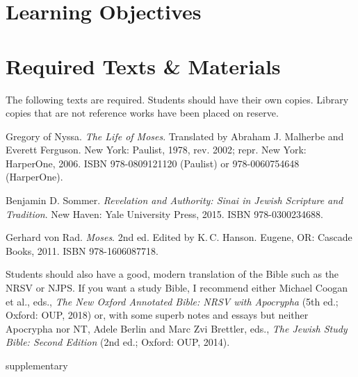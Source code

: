 \documentclass[titlepage]{article}
\newcommand\incl{../includes}
\begin{document}


\section{Learning Objectives}
\label{objectives}

\edobject

\section{Required Texts \& Materials}
\label{texts}

The following texts are required. Students should have their own copies.
Library copies that are not reference works have been placed on reserve.

\begingroup
\renewcommand{\section}[2]{}%
\begin{thebibliography}{Sommer}%

	 Gregory of Nyssa.
	\emph{The Life of Moses}. Translated by Abraham J. Malherbe and Everett Ferguson.
	New York: Paulist, 1978, rev. 2002; repr. New York: HarperOne, 2006.
	ISBN 978-0809121120 (Paulist) or 978-0060754648 (HarperOne).

	 Benjamin D. Sommer.
	\emph{Revelation and Authority: Sinai in Jewish Scripture and Tradition}.
	New Haven: Yale University Press, 2015.
	ISBN 978-0300234688.

	 Gerhard von Rad.
	\emph{Moses}. 2nd ed. Edited by K.\,C. Hanson.
	Eugene, OR: Cascade Books, 2011.
	ISBN 978-1606087718.

\end{thebibliography}
\endgroup

Students should also have a good, modern translation of the Bible such
as the NRSV or NJPS. If you want a study Bible, I recommend either
Michael Coogan et al., eds., \emph{The New Oxford Annotated Bible: NRSV
with Apocrypha} (5th ed.; Oxford: OUP, 2018) or, with some superb notes
and essays but neither Apocrypha nor NT, Adele Berlin and Marc Zvi
Brettler, eds., \emph{The Jewish Study Bible: Second Edition} (2nd ed.;
Oxford: OUP, 2014).

\section{Supplementary Texts}
\label{supplementary}
\end{document}
